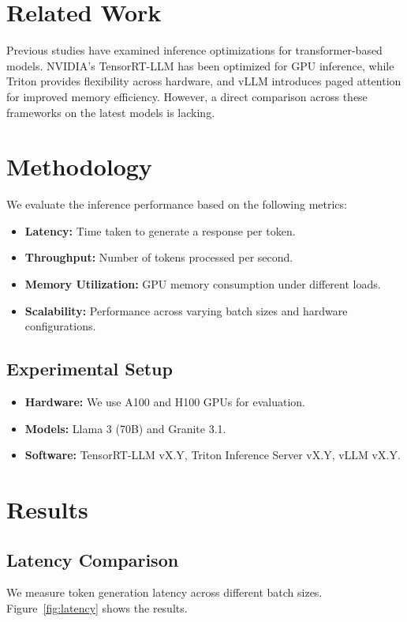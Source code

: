 \documentclass[11pt, oneside]{article}   	%
\begin{document}
\section{Related Work}
Previous studies have examined inference optimizations for transformer-based models. NVIDIA's TensorRT-LLM has been optimized for GPU inference, while Triton provides flexibility across hardware, and vLLM introduces paged attention for improved memory efficiency. However, a direct comparison across these frameworks on the latest models is lacking.

\section{Methodology}
We evaluate the inference performance based on the following metrics:
\begin{itemize}
    \item \textbf{Latency:} Time taken to generate a response per token.
    \item \textbf{Throughput:} Number of tokens processed per second.
    \item \textbf{Memory Utilization:} GPU memory consumption under different loads.
    \item \textbf{Scalability:} Performance across varying batch sizes and hardware configurations.
\end{itemize}

\subsection{Experimental Setup}
\begin{itemize}
    \item \textbf{Hardware:} We use A100 and H100 GPUs for evaluation.
    \item \textbf{Models:} Llama 3 (70B) and Granite 3.1.
    \item \textbf{Software:} TensorRT-LLM vX.Y, Triton Inference Server vX.Y, vLLM vX.Y.
\end{itemize}

\section{Results}
\subsection{Latency Comparison}
We measure token generation latency across different batch sizes. Figure~\ref{fig:latency} shows the results.
\end{document}
